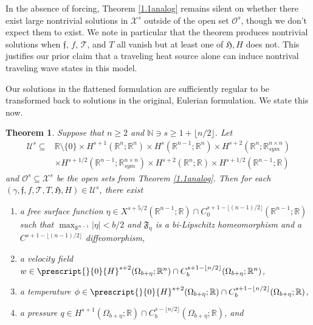 \documentclass[11pt,letterpaper,reqno]{amsart}
\newtheorem{theorem}{Theorem}[section]
\numberwithin{equation}{section}
\newcommand{\abs}[1]{\left\lvert#1\right\rvert}
\begin{document}
In the absence of forcing, Theorem \ref{1.1analog} remains silent on whether there exist large nontrivial solutions in \(\mathcal{X}^{s}\) outside of the open set $\mathcal{O}^{s}$, though we don't expect them to exist.  We note in particular that the theorem produces nontrivial solutions when $\mathfrak{f}$, $f$, $\mathcal{T}$, and $T$ all vanish but at least one of $\mathfrak{H},H$ does not.  This justifies our prior claim that a traveling heat source alone can induce nontrival traveling wave states in this model.




Our solutions in the flattened formulation are sufficiently regular to be transformed back to solutions in the original, Eulerian formulation.  We state this now.


\begin{theorem} \label{1.3analog}
    Suppose that \(n \geq 2\) and \(\mathbb{N} \ni s \geq 1+\lfloor n/2 \rfloor\). Let
    \begin{align}
        \mathcal{U}^{s} \subseteq &\mathbb{R} \setminus \{0\} \times H^{s+1}(\mathbb{R}^{n};\mathbb{R}^{n}) \times H^{s}(\mathbb{R}^{n-1};\mathbb{R}^{n}) \times H^{s+2}(\mathbb{R}^{n};\mathbb{R}_{sym}^{n \times n}) \nonumber \\
        &\times H^{s+1/2}(\mathbb{R}^{n-1};\mathbb{R}_{sym}^{n \times n}) \times H^{s+2}(\mathbb{R}^{n};\mathbb{R}) \times H^{s+1/2}(\mathbb{R}^{n-1};\mathbb{R})
    \end{align}
    and \(\mathcal{O}^{s}\subseteq \mathcal{X}^{s}\) be the open sets from Theorem \ref{1.1analog}. Then for each \((\gamma,\mathfrak{f},f, \mathcal{T},T,\mathfrak{H},H) \in \mathcal{U}^{s}\), there exist
    \begin{enumerate}
        \item a free surface function \(\eta \in X^{s+5/2}(\mathbb{R}^{n-1};\mathbb{R}) \cap C_{0}^{s+1-\lfloor (n-1)/2\rfloor}(\mathbb{R}^{n-1};\mathbb{R})\) such that \(\max_{\mathbb{R}^{n-1}}\abs{\eta}<b/2\) and \(\mathfrak{F}_{\eta}\) is a bi-Lipschitz homeomorphism and a \(C^{s+1-\lfloor (n-1)/2\rfloor}\) diffeomorphism,
        \item a velocity field \(w \in \prescript{}{0}{H}^{s+2}(\Omega_{b+\eta};\mathbb{R}^{n}) \cap C_{b}^{s+1-\lfloor n/2\rfloor}(\Omega_{b+\eta};\mathbb{R}^{n})\),
        \item a temperature \(\phi \in \prescript{}{0}{H}^{s+2}(\Omega_{b+\eta};\mathbb{R}) \cap C_{b}^{s+1-\lfloor n/2\rfloor}(\Omega_{b+\eta};\mathbb{R})\),
        \item a pressure \(q \in H^{s+1}(\Omega_{b+\eta};\mathbb{R}) \cap C_{b}^{s-\lfloor n/2 \rfloor}(\Omega_{b+\eta};\mathbb{R})\), and

\end{enumerate}
\end{theorem}
\end{document}
